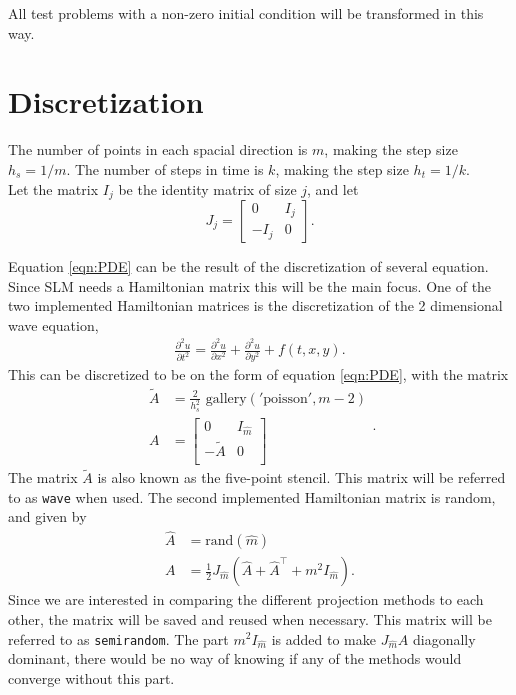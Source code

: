 All test problems with a non-zero initial condition will be transformed in this way.

\section{Discretization}
The number of points in each spacial direction is $m$, making the step size $h_s = 1/m$. The number of steps in time is $k$, making the step size $h_t = 1/k$.\\

Let the matrix $I_j$ be the identity matrix of size $j$, and let 
\begin{equation}
J_j = 
\begin{bmatrix}
0&I_j\\-I_j&0
\end{bmatrix}.
\end{equation}

Equation \eqref{eqn:PDE} can be the result of the discretization of several equation. Since SLM needs a Hamiltonian matrix this will be the main focus. One of the two implemented Hamiltonian matrices is the discretization of the 2 dimensional wave equation, 
\begin{equation}
\begin{aligned}
\frac{\partial^2 u}{\partial t^2} = \frac{\partial^2 u}{\partial x^2}+ \frac{\partial^2 u}{\partial y^2} + f(t,x,y).
\end{aligned}
\label{eqn:wave}
\end{equation}
This can be discretized to be on the form of equation \eqref{eqn:PDE}, with the matrix
\begin{equation}
\begin{aligned}
\tilde{A} &= \frac{2}{h_s^2} \text{ gallery}('\text{poisson}', m-2) \\
A &= 
\begin{bmatrix}
 0 & I_{\hat{m}} \\ - \tilde{A} & 0 \\
\end{bmatrix}
\end{aligned}.
\end{equation}
The matrix $\tilde{A}$ is also known as the five-point stencil\cite{fivepoint}. This matrix will be referred to as \texttt{wave} when used. The second implemented Hamiltonian matrix is random, and given by
\begin{equation}
\begin{aligned}
\hat{A} &= \text{rand}(\hat{m}) \\
A &= \frac{1}{2} J_{\hat{m}} (\hat{A} + \hat{A}^\top + m^2 I_{\hat{m}}).
\end{aligned}
\end{equation}
Since we are interested in comparing the different projection methods to each other, the matrix will be saved and reused when necessary. This matrix will be referred to as \texttt{semirandom}. The part $m^2 I_{\hat{m}} $ is added to make $J_{\hat{m}}A$ diagonally dominant, there would be no way of knowing if any of the methods would converge without this part.%

